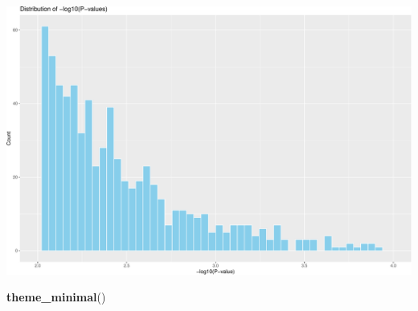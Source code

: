 \documentclass[
  12pt,
]{article}
\newenvironment{Shaded}{\begin{snugshade}}{\end{snugshade}}
\newcommand{\FunctionTok}[1]{\textcolor[rgb]{0.13,0.29,0.53}{\textbf{#1}}}
\newcommand{\NormalTok}[1]{#1}
\begin{document}
\includegraphics{Arkesh_Das_CMSE_410_Semester_Project_files/figure-latex/normal distribution testing-2.pdf}

\begin{Shaded}
\begin{Highlighting}[]
  \FunctionTok{theme\_minimal}\NormalTok{()}
\end{Highlighting}
\end{Shaded}
\end{document}
